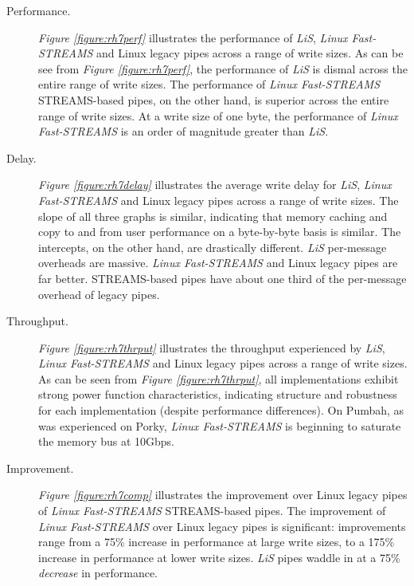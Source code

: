 \documentclass[letterpaper,final,notitlepage,twocolumn,10pt,twoside]{article}
\begin{document}
\begin{description}

\item[Performance.]

\textit{Figure \ref{figure:rh7perf}} illustrates the performance of
\textsl{LiS}, \textsl{Linux Fast-STREAMS} and Linux legacy pipes across a
range of write sizes.  As can be see from \textit{Figure
\ref{figure:rh7perf}}, the performance of \textsl{LiS} is dismal across the
entire range of write sizes.  The performance of \textsl{Linux Fast-STREAMS}
STREAMS-based pipes, on the other hand, is superior across the entire range of
write sizes.  At a write size of one byte, the performance of \textsl{Linux
Fast-STREAMS} is an order of magnitude greater than \textsl{LiS}.

\item[Delay.]

\textit{Figure \ref{figure:rh7delay}} illustrates the average write delay for
\textsl{LiS}, \textsl{Linux Fast-STREAMS} and Linux legacy pipes across a
range of write sizes.  The slope of all three graphs is similar, indicating
that memory caching and copy to and from user performance on a byte-by-byte
basis is similar.  The intercepts, on the other hand, are drastically
different.  \textsl{LiS} per-message overheads are massive.  \textsl{Linux
Fast-STREAMS} and Linux legacy pipes are far better.  STREAMS-based pipes have
about one third of the per-message overhead of legacy pipes.

\item[Throughput.]

\textit{Figure \ref{figure:rh7thrput}} illustrates the throughput experienced
by \textsl{LiS}, \textsl{Linux Fast-STREAMS} and Linux legacy pipes across a
range of write sizes.  As can be seen from \textit{Figure
\ref{figure:rh7thrput}}, all implementations exhibit strong power function
characteristics, indicating structure and robustness for each implementation
(despite performance differences).  On Pumbah, as was experienced on Porky,
\textsl{Linux Fast-STREAMS} is beginning to saturate the memory bus at 10Gbps.

\item[Improvement.]

\textit{Figure \ref{figure:rh7comp}} illustrates the improvement over Linux
legacy pipes of \textsl{Linux Fast-STREAMS} STREAMS-based pipes.  The
improvement of \textsl{Linux Fast-STREAMS} over Linux legacy pipes is
significant: improvements range from a 75\% increase in performance at large
write sizes, to a 175\% increase in performance at lower write sizes.
\textsl{LiS} pipes waddle in at a 75\% {\em decrease} in performance.

\end{description}
\end{document}
